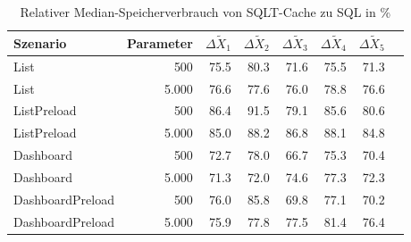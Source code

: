 
\begin{table}[ht]
\setlength{\extrarowheight}{-1pt}
\centering
\caption{Relativer Median-Speicherverbrauch von SQLT-Cache zu SQL in \%}
\begin{tabular}{lrrrrrrr}
\toprule
Szenario & Parameter & ${\Delta \tilde{X}_1}$ & ${\Delta \tilde{X}_2}$ & ${\Delta \tilde{X}_3}$ & ${\Delta \tilde{X}_4}$ & ${\Delta \tilde{X}_5}$ \\
\midrule
	List & 500 & \cellcolor{green!12}  75.5 & \cellcolor{green!10}  80.3 & \cellcolor{green!14}  71.6 & \cellcolor{green!12}  75.5 & \cellcolor{green!14}  71.3 \\
	List & 5.000 & \cellcolor{green!12}  76.6 & \cellcolor{green!11}  77.6 & \cellcolor{green!12}  76.0 & \cellcolor{green!11}  78.8 & \cellcolor{green!12}  76.6 \\
	ListPreload & 500 & \cellcolor{green!7}  86.4 & \cellcolor{green!4}  91.5 & \cellcolor{green!10}  79.1 & \cellcolor{green!7}  85.6 & \cellcolor{green!10}  80.6 \\
	ListPreload & 5.000 & \cellcolor{green!8}  85.0 & \cellcolor{green!6}  88.2 & \cellcolor{green!7}  86.8 & \cellcolor{green!6}  88.1 & \cellcolor{green!8}  84.8 \\
	Dashboard & 500 & \cellcolor{green!14}  72.7 & \cellcolor{green!11}  78.0 & \cellcolor{green!17}  66.7 & \cellcolor{green!12}  75.3 & \cellcolor{green!15}  70.4 \\
	Dashboard & 5.000 & \cellcolor{green!14}  71.3 & \cellcolor{green!14}  72.0 & \cellcolor{green!13}  74.6 & \cellcolor{green!11}  77.3 & \cellcolor{green!14}  72.3 \\
	DashboardPreload & 500 & \cellcolor{green!12}  76.0 & \cellcolor{green!7}  85.8 & \cellcolor{green!15}  69.8 & \cellcolor{green!11}  77.1 & \cellcolor{green!15}  70.2 \\
	DashboardPreload & 5.000 & \cellcolor{green!12}  75.9 & \cellcolor{green!11}  77.8 & \cellcolor{green!11}  77.5 & \cellcolor{green!9}  81.4 & \cellcolor{green!12}  76.4 \\
\bottomrule
\end{tabular}
\label{tab:relativer_speicherverbrauch_sqltcache}
\end{table}
	